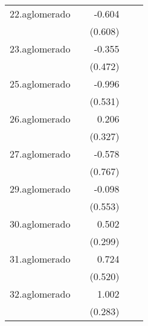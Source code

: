 {\begin{longtable}{l*{4}{D{.}{.}{-1}}}
\addlinespace
22.aglomerado&                     &      -0.604         &                     &                     \\
            &                     &     (0.608)         &                     &                     \\
\addlinespace
23.aglomerado&                     &      -0.355         &                     &                     \\
            &                     &     (0.472)         &                     &                     \\
\addlinespace
25.aglomerado&                     &      -0.996         &                     &                     \\
            &                     &     (0.531)         &                     &                     \\
\addlinespace
26.aglomerado&                     &       0.206         &                     &                     \\
            &                     &     (0.327)         &                     &                     \\
\addlinespace
27.aglomerado&                     &      -0.578         &                     &                     \\
            &                     &     (0.767)         &                     &                     \\
\addlinespace
29.aglomerado&                     &      -0.098         &                     &                     \\
            &                     &     (0.553)         &                     &                     \\
\addlinespace
30.aglomerado&                     &       0.502         &                     &                     \\
            &                     &     (0.299)         &                     &                     \\
\addlinespace
31.aglomerado&                     &       0.724         &                     &                     \\
            &                     &     (0.520)         &                     &                     \\
\addlinespace
32.aglomerado&                     &       1.002\sym{***}&                     &                     \\
            &                     &     (0.283)         &                     &                     \\

\end{longtable}}
